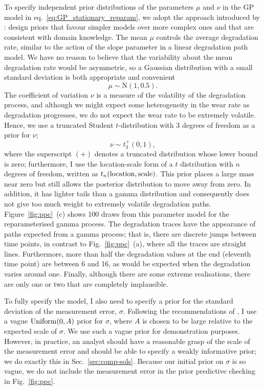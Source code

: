 To specify independent prior distributions of the parameters $\mu$ and $\nu$ in the GP model in eq.~\eqref{eq:GP_stationary_reparam}, we adopt the approach introduced by \cite{Simpson_2017}: design priors that favour simpler models over more complex ones and that are consistent with domain knowledge. The mean $\mu$ controls the average degradation rate, similar to the action of the slope parameter in a linear degradation path model. We have no reason to believe that the variability about the mean degradation rate would be asymmetric, so a Gaussian distribution with a small standard deviation is both appropriate and convenient
\begin{equation*}
  \mu \sim \mbox{N}(1, 0.5).
\end{equation*}
The coefficient of variation $\nu$ is a measure of the volatility of the degradation process, and although we might expect some heterogeneity in the wear rate as degradation progresses, we do not expect the wear rate to be extremely volatile. Hence, we use a truncated Student $t$-distribution with 3 degrees of freedom as a prior for $\nu$;
\begin{equation*}
  \nu \sim t_3^{+}(0, 1),
\end{equation*}
where the superscript $(+)$ denotes a truncated distribution whose lower bound is zero; furthermore, I use the location-scale form of a $t$ distribution with $n$ degrees of freedom, written as $t_n(\hbox{location}, \hbox{scale})$. This prior places a large mass near zero but still allows the posterior distribution to move away from zero. In addition, it has lighter tails than a gamma distribution and consequently does not give too much weight to extremely volatile degradation paths. Figure~\ref{fig:ppc}~(c) shows 100 draws from this parameter model for the reparameterised gamma process. The degradation traces have the appearance of paths expected from a gamma process; that is, there are discrete jumps between time points, in contrast to Fig.~\ref{fig:ppc}~(a), where all the traces are straight lines. Furthermore, more than half the degradation values at the end (eleventh time point) are between 6 and 16, as would be expected when the degradation varies around one. Finally, although there are some extreme realisations, there are only one or two that are completely implausible.

To fully specify the model, I also need to specify a prior for the standard deviation of the measurement error, $\sigma$. Following the recommendations of \citet[Chap.~17]{gelman_workflow_2020}, I use a vague $\hbox{Uniform}(0, A)$ prior for $\sigma$, where $A$ is chosen to be large relative to the expected scale of $\sigma$. We use such a vague prior for demonstration purposes. However, in practice, an analyst should have a reasonable grasp of the scale of the measurement error and should be able to specify a weakly informative prior; we do exactly this in Sec.~\ref{sec:comp-sols}. Because our initial prior on $\sigma$ is so vague, we do not include the measurement error in the prior predictive checking in Fig.~\ref{fig:ppc}.

